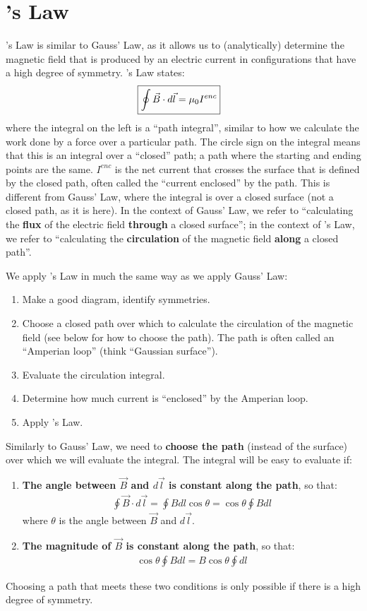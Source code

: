 \section{\ampere's Law}
\ampere's Law is similar to Gauss' Law, as it allows us to (analytically) determine the magnetic field that is produced by an electric current in configurations that have a high degree of symmetry. \ampere's Law states:
\begin{align*}
\Aboxed{\oint \vec B \cdot d\vec l =\mu_0 I^{enc}}
\end{align*}
where the integral on the left is a ``path integral'', similar to how we calculate the work done by a force over a particular path. The circle sign on the integral means that this is an integral over a ``closed'' path; a path where the starting and ending points are the same. $I^{enc}$ is the net current that crosses the surface that is defined by the closed path, often called the ``current enclosed'' by the path. This is different from Gauss' Law, where the integral is over a closed surface (not a closed path, as it is here). In the context of Gauss' Law, we refer to ``calculating the \textbf{flux} of the electric field \textbf{through} a closed surface''; in the context of \ampere's Law, we refer to ``calculating the \textbf{circulation} of the magnetic field \textbf{along} a closed path''.

We apply \ampere's Law in much the same way as we apply Gauss' Law:
\begin{enumerate}
\item Make a good diagram, identify symmetries.
\item Choose a closed path over which to calculate the circulation of the magnetic field (see below for how to choose the path). The path is often called an ``Amperian loop'' (think ``Gaussian surface'').
\item Evaluate the circulation integral. 
\item Determine how much current is ``enclosed'' by the Amperian loop. 
\item Apply \ampere's Law.
\end{enumerate}

Similarly to Gauss' Law, we need to \textbf{choose the path} (instead of the surface) over which we will evaluate the integral. The integral will be easy to evaluate if:
\begin{enumerate}
\item \textbf{The angle between $\vec B$ and $d\vec l$ is constant along the path}, so that:
\begin{align*}
\oint  \vec B \cdot d\vec l = \oint B dl \cos\theta = \cos\theta \oint B dl
\end{align*}
where $\theta$ is the angle between $\vec B$ and $d\vec l$.
\item \textbf{The magnitude of $\vec B$ is constant along the path}, so that:
\begin{align*}
\cos\theta \oint B dl = B\cos\theta \oint dl
\end{align*}
\end{enumerate}
Choosing a path that meets these two conditions is only possible if there is a high degree of symmetry.

